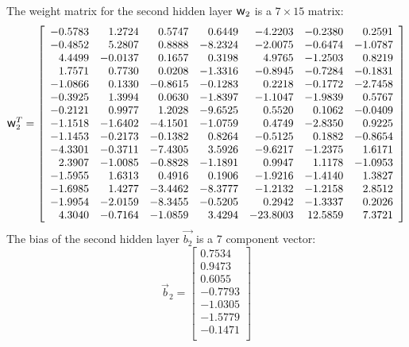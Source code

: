 \documentclass[twoside,english,1p,final,sort&compress]{elsarticle}
\theoremstyle{plain}
\DeclareRobustCommand{\w}{\mbox{\large\ensuremath{\mathsf{w}}}}
\begin{document}
The weight matrix for the second hidden layer $\w_2$ is a $7\times15$ matrix:
\begin{equation*}
\w_2^T = \left[
\begin{array}{rrrrrrr}
-0.5783 & 1.2724 & 0.5747 & 0.6449 & -4.2203 & -0.2380 & 0.2591\\
-0.4852 & 5.2807 & 0.8888 & -8.2324 & -2.0075 & -0.6474 & -1.0787\\
4.4499 & -0.0137 & 0.1657 & 0.3198 & 4.9765 & -1.2503 & 0.8219\\
1.7571 & 0.7730 & 0.0208 & -1.3316 & -0.8945 & -0.7284 & -0.1831\\
-1.0866 & 0.1330 & -0.8615 & -0.1283 & 0.2218 & -0.1772 & -2.7458\\
-0.3925 & 1.3994 & 0.0630 & -1.8397 & -1.1047 & -1.9839 & 0.5767\\
-0.2121 & 0.9977 & 1.2028 & -9.6525 & 0.5520 & 0.1062 & -0.0409\\
-1.1518 & -1.6402 & -4.1501 & -1.0759 & 0.4749 & -2.8350 & 0.9225\\
-1.1453 & -0.2173 & -0.1382 & 0.8264 & -0.5125 & 0.1882 & -0.8654\\
-4.3301 & -0.3711 & -7.4305 & 3.5926 & -9.6217 & -1.2375 & 1.6171\\
2.3907 & -1.0085 & -0.8828 & -1.1891 & 0.9947 & 1.1178 & -1.0953\\
-1.5955 & 1.6313 & 0.4916 & 0.1906 & -1.9216 & -1.4140 & 1.3827\\
-1.6985 & 1.4277 & -3.4462 & -8.3777 & -1.2132 & -1.2158 & 2.8512\\
-1.9954 & -2.0159 & -8.3455 & -0.5205 & 0.2942 & -1.3337 & 0.2026\\
4.3040 & -0.7164 & -1.0859 & 3.4294 & -23.8003 & 12.5859 & 7.3721\\
\end{array}\right]
\end{equation*}
The bias of the second hidden layer $\overrightarrow{b_2}$ is a 7 component vector:
\begin{equation*}
\overrightarrow{b}_2 = \left[
\begin{array}{r}
0.7534\\
0.9473\\
0.6055\\
-0.7793\\
-1.0305\\
-1.5779\\
-0.1471\\
\end{array}\right]
\end{equation*}
\end{document}
